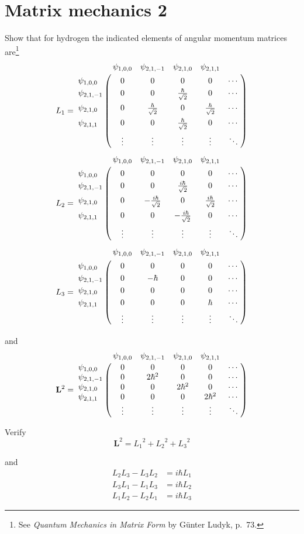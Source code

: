 

\section*{Matrix mechanics 2}

Show that for hydrogen the indicated elements of angular momentum matrices are\footnote
{See {\it Quantum Mechanics in Matrix Form} by G\"unter Ludyk, p.~73.}
\begin{align*}
L_1&=
\bordermatrix{
& \psi_{1,0,0} & \psi_{2,1,-1} & \psi_{2,1,0} & \psi_{2,1,1} \cr
\psi_{1,0,0} & 0 & 0 & 0 & 0 & \cdots \cr
\psi_{2,1,-1} & 0 & 0 & \frac{\hbar}{\sqrt2} & 0 & \cdots \cr
\psi_{2,1,0} & 0 & \frac{\hbar}{\sqrt2} & 0 & \frac{\hbar}{\sqrt2} & \cdots \cr
\psi_{2,1,1} & 0 & 0 & \frac{\hbar}{\sqrt2} & 0 & \cdots \cr
& \vdots & \vdots & \vdots & \vdots & \ddots
}
\\[1ex]
L_2&=
\bordermatrix{
& \psi_{1,0,0} & \psi_{2,1,-1} & \psi_{2,1,0} & \psi_{2,1,1} \cr
\psi_{1,0,0} & 0 & 0 & 0 & 0 & \cdots \cr
\psi_{2,1,-1} & 0 & 0 & \frac{i\hbar}{\sqrt2} & 0 & \cdots \cr
\psi_{2,1,0} & 0 & -\frac{i\hbar}{\sqrt2} & 0 & \frac{i\hbar}{\sqrt2} & \cdots \cr
\psi_{2,1,1} & 0 & 0 & -\frac{i\hbar}{\sqrt2} & 0 & \cdots \cr
& \vdots & \vdots & \vdots & \vdots & \ddots
}
\\[1ex]
L_3&=
\bordermatrix{
& \psi_{1,0,0} & \psi_{2,1,-1} & \psi_{2,1,0} & \psi_{2,1,1} \cr
\psi_{1,0,0} & 0 & 0 & 0 & 0 & \cdots \cr
\psi_{2,1,-1} & 0 & -\hbar & 0 & 0 & \cdots \cr
\psi_{2,1,0} & 0 & 0 & 0 & 0 & \cdots \cr
\psi_{2,1,1} & 0 & 0 & 0 & \hbar & \cdots \cr
& \vdots & \vdots & \vdots & \vdots & \ddots
}
\end{align*}

and
\begin{equation*}
\mathbf L^2=
\bordermatrix{
& \psi_{1,0,0} & \psi_{2,1,-1} & \psi_{2,1,0} & \psi_{2,1,1} \cr
\psi_{1,0,0} & 0 & 0 & 0 & 0 & \cdots \cr
\psi_{2,1,-1} & 0 & 2\hbar^2 & 0 & 0 & \cdots \cr
\psi_{2,1,0} & 0 & 0 & 2\hbar^2 & 0 & \cdots \cr
\psi_{2,1,1} & 0 & 0 & 0 & 2\hbar^2 & \cdots \cr
& \vdots & \vdots & \vdots & \vdots & \ddots
}
\end{equation*}

Verify
\begin{equation*}
\mathbf L^2={L_1}^2+{L_2}^2+{L_3}^2
\end{equation*}

and
\begin{align*}
L_2L_3-L_3L_2&=i\hbar L_1
\\
L_3L_1-L_1L_3&=i\hbar L_2
\\
L_1L_2-L_2L_1&=i\hbar L_3
\end{align*}

